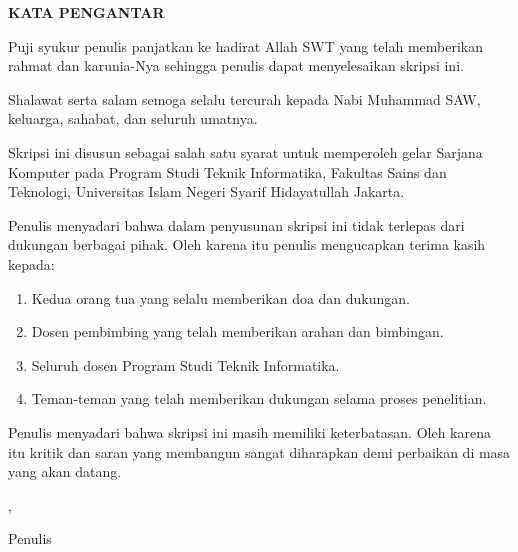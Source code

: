 \begin{center}
{\Large \textbf{KATA PENGANTAR}}
\end{center}

\vspace{1cm}

Puji syukur penulis panjatkan ke hadirat Allah SWT yang telah memberikan 
rahmat dan karunia-Nya sehingga penulis dapat menyelesaikan skripsi ini.

Shalawat serta salam semoga selalu tercurah kepada Nabi Muhammad SAW, 
keluarga, sahabat, dan seluruh umatnya.

Skripsi ini disusun sebagai salah satu syarat untuk memperoleh gelar 
Sarjana Komputer pada Program Studi Teknik Informatika, Fakultas Sains 
dan Teknologi, Universitas Islam Negeri Syarif Hidayatullah Jakarta.

Penulis menyadari bahwa dalam penyusunan skripsi ini tidak terlepas dari 
dukungan berbagai pihak. Oleh karena itu penulis mengucapkan terima kasih 
kepada:

\begin{enumerate}
\item Kedua orang tua yang selalu memberikan doa dan dukungan.
\item Dosen pembimbing yang telah memberikan arahan dan bimbingan.
\item Seluruh dosen Program Studi Teknik Informatika.
\item Teman-teman yang telah memberikan dukungan selama proses penelitian.
\end{enumerate}

Penulis menyadari bahwa skripsi ini masih memiliki keterbatasan. Oleh 
karena itu kritik dan saran yang membangun sangat diharapkan demi 
perbaikan di masa yang akan datang.

\vspace{2cm}

\begin{flushright}
\kota, \tanggalKataPengantar

\vspace{2cm}

Penulis
\end{flushright}

\newpage

